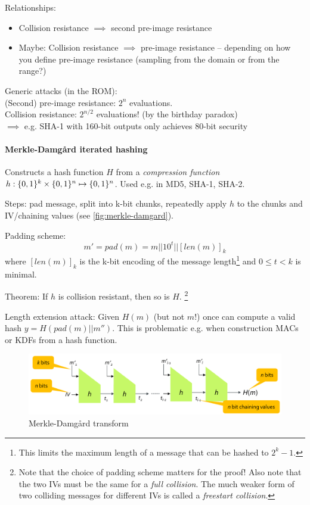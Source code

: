 Relationships:
\begin{itemize}
\item Collision resistance $\implies$ second pre-image resistance
\item Maybe: Collision resistance $\implies$ pre-image resistance -- depending on how you define pre-image resistance (sampling from the domain or from the range?)
\end{itemize}

Generic attacks (in the ROM):\\
(Second) pre-image resistance: $2^n$ evaluations.\\
Collision resistance: $2^{n/2}$ evaluations! (by the birthday paradox)\\
$\implies$ e.g. SHA-1 with 160-bit outputs only achieves 80-bit security

\paragraph{Merkle-Damgård iterated hashing}
Constructs a hash function $H$ from a \emph{compression function} \mbox{$h: \lbrace 0, 1 \rbrace^k \times \lbrace 0, 1 \rbrace^n \mapsto \lbrace 0, 1 \rbrace^n$}.
Used e.g. in MD5, SHA-1, SHA-2.

Steps: pad message, split into k-bit chunks, repeatedly apply $h$ to the chunks and IV/chaining values (see \autoref{fig:merkle-damgard}).

Padding scheme:
$$ m' = pad(m) = m || 10^t || [len(m)]_k $$
where $[len(m)]_k$ is the k-bit encoding of the message length\footnote{This limits the maximum length of a message that can be hashed to $2^k - 1$.}
and $0 \leq t < k$ is minimal.

Theorem: If $h$ is collision resistant, then so is $H$.%
\footnote{Note that the choice of padding scheme matters for the proof!
Also note that the two IVs must be the same for a \emph{full collision}.
The much weaker form of two colliding messages for different IVs is called a \emph{freestart collision}.}

Length extension attack:
Given $H(m)$ (but not $m$!) once can compute a valid hash $y=H(pad(m)||m'')$.
This is problematic e.g. when construction MACs or KDFs from a hash function.

\begin{figure}[h]
    \centering
	\includegraphics[scale=0.4]{images/merkle-damgard.png}
    \caption{Merkle-Damgård transform}
    \label{fig:merkle-damgard}
\end{figure}

